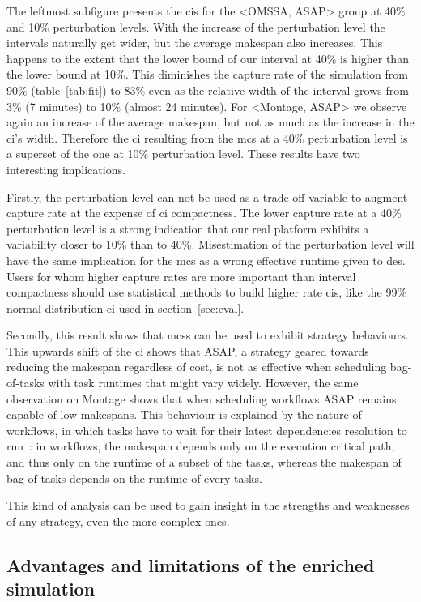 \documentclass[]{llncs}
\begin{document}
The leftmost subfigure presents the \acp{ci} for the <OMSSA, ASAP> group at
40\% and 10\% perturbation levels. With the increase of the perturbation level
the intervals naturally get wider, but the average makespan also increases. 
This happens to the 
extent that the lower bound of our interval at 40\% is higher than the lower
bound at 10\%. This diminishes the capture rate of the simulation from 90\%
(table~\ref{tab:fit}) to 83\% even as the relative width of the interval grows
from 3\% (7 minutes) to 10\% (almost 24 minutes). For <Montage, ASAP> we observe
again an increase of the average makespan, but not as much as the increase in
the \ac{ci}'s width. Therefore the \ac{ci} resulting from the \ac{mcs} at a
40\% perturbation level is a superset of the one at 10\% perturbation level.
These results have two interesting implications.

Firstly, the perturbation level can
not be used as a trade-off variable to augment capture rate at the expense of
\ac{ci} compactness. The lower capture rate at a 40\% perturbation level is a
strong indication that our real platform exhibits a variability closer to
10\% than to 40\%. Misestimation of the perturbation level will have the same
implication for the \ac{mcs} as a wrong effective runtime given to \ac{des}. 
Users for whom higher capture rates are more important than
interval compactness should use statistical methods to build higher rate \acp{ci},
like the 99\% normal distribution \ac{ci} used in section~\ref{sec:eval}.

Secondly, this result shows that \ac{mcs}s can be used to exhibit strategy
behaviours. This upwards shift of the \ac{ci} shows that ASAP, a strategy
geared towards reducing the makespan regardless of cost, is not as effective
when scheduling bag-of-tasks with task runtimes that might vary
widely. However, the same observation on Montage shows that when
scheduling workflows ASAP remains capable of low makespans. 
This behaviour is explained by the nature of workflows,
in which tasks have to wait for their latest dependencies resolution to run~: 
in workflows, the makespan depends only on the execution critical path, and thus
only on the runtime of a subset of the tasks, whereas the makespan of bag-of-tasks 
depends on the runtime of every tasks.

This kind of analysis can be used to gain insight in the strengths and
weaknesses of any strategy, even the more complex ones.


\subsection{Advantages and limitations of the enriched simulation}\label{sec:lim}
\end{document}
